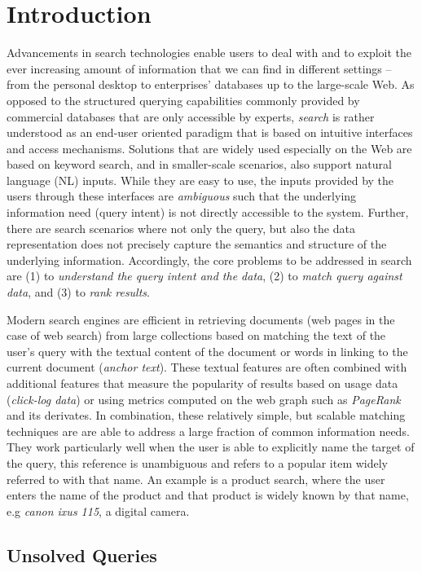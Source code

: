 \section{Introduction}
Advancements in search technologies enable users to deal with and to exploit the ever increasing amount of information that we can find in different settings -- from the personal desktop to enterprises' databases up to the large-scale Web. As opposed to the structured querying capabilities commonly provided by commercial databases that are only accessible by experts, \emph{search} is rather understood as an end-user oriented paradigm that is based on intuitive interfaces and access mechanisms. Solutions that are widely used especially on the Web are based on keyword search, and in smaller-scale scenarios, also support natural language (NL) inputs. While they are easy to use, the inputs provided by the users through these interfaces are \emph{ambiguous} such that the underlying information need (query intent) is not directly accessible to the system. Further, there are search scenarios where not only the query, but also the data representation does not precisely capture the semantics and structure of the underlying information. Accordingly, the core problems to be addressed in search are (1) to \emph{understand the query intent and the data}, (2) to \emph{match query against data}, and (3) to \emph{rank results}. 

Modern search engines are efficient in retrieving documents (web pages in the case of web search) from large collections based on matching the text of the user's query with the textual content of the document or words in linking to the current document (\emph{anchor text}). These textual features are often combined with additional features that measure the popularity of results based on usage data (\emph{click-log data}) or using metrics computed on the web graph such as \emph{PageRank} and its derivates. In combination, these relatively simple, but scalable matching techniques are are able to address a large fraction of common information needs. They work particularly well when the user is able to explicitly name the target of the query, this reference is unambiguous and refers to a popular item widely referred to with that name. An example is a product search, where the user enters the name of the product and that product is widely known by that name, e.g \emph{canon ixus 115}, a digital camera.


\subsection{Unsolved Queries}

